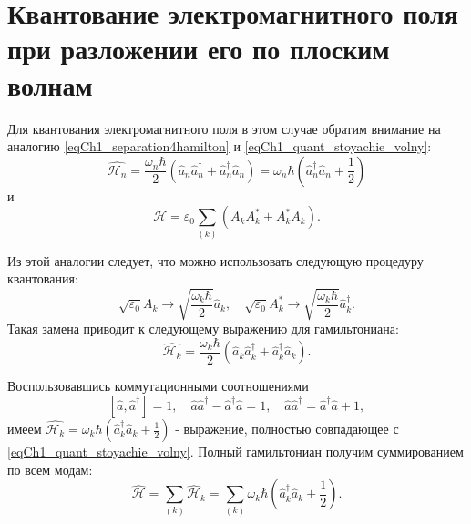 \section{Квантование электромагнитного поля при разложении его по
  плоским волнам}
Для квантования электромагнитного поля в этом случае обратим внимание
на аналогию \eqref{eqCh1_separation4hamilton} и
\eqref{eqCh1_quant_stoyachie_volny}:
\[
\hat{\mathcal{H}_n} = 
\frac{\omega_n \hbar}{2}
\left(\hat{a}_n \hat{a}_n^{\dag} + \hat{a}_n^{\dag} \hat{a}_n\right)
=
\omega_n \hbar 
\left(\hat{a}_n^{\dag} \hat{a}_n + \frac{1}{2}\right)
\]
и
\[
\mathcal{H} = \varepsilon_0 \sum_{(k)} 
\left(A_k A_k^{*} + A_k^{*} A_k \right).
\]

Из этой аналогии следует, что можно использовать следующую процедуру
квантования:
\[
\sqrt{\varepsilon_0}A_k \rightarrow \sqrt{\frac{\omega_k \hbar}{2}}
\hat{a}_k, \quad
\sqrt{\varepsilon_0}A_k^{*} \rightarrow \sqrt{\frac{\omega_k \hbar}{2}}
\hat{a}_k^{\dag}.
\]
Такая замена приводит к следующему выражению для гамильтониана:
\[
\hat{\mathcal{H}_k} = \frac{\omega_k \hbar}{2} 
\left(\hat{a}_k \hat{a}_k^{\dag} + \hat{a}_k^{\dag} \hat{a}_k\right).
\]

Воспользовавшись коммутационными соотношениями
\[
\left[\hat{a}, \hat{a}^{\dag} \right] = 1, \quad
\hat{a} \hat{a}^{\dag} - \hat{a}^{\dag}\hat{a} = 1, \quad
\hat{a} \hat{a}^{\dag} = \hat{a}^{\dag}\hat{a} + 1,
\]
имеем
\(
\hat{\mathcal{H}_k} = \omega_k \hbar 
\left(\hat{a}_k^{\dag} \hat{a}_k + \frac{1}{2}\right)
\) - 
выражение, полностью совпадающее с \eqref{eqCh1_quant_stoyachie_volny}.
Полный гамильтониан получим суммированием по всем модам:
\begin{equation}
\hat{\mathcal{H}} = \sum_{(k)} \hat{\mathcal{H}}_k = \sum_{(k)} 
\omega_k \hbar \left(\hat{a}_k^{\dag} \hat{a}_k + \frac{1}{2}\right).
\end{equation}

